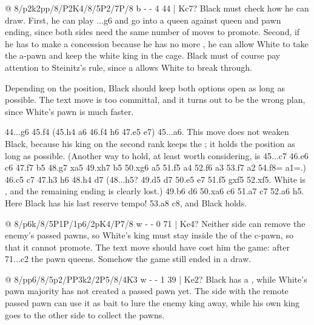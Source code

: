 @ 8/p2k2pp/8/P2K4/8/5P2/7P/8 b - - 4 44 | Kc7?
Black must check how he can draw. First, he can play ...g6 and go into a queen against queen and pawn
ending, since both sides need the same number of moves to promote. Second, if he has to make a
concession because he has no more ,
he can allow White to take the a-pawn and keep the white king in the cage. Black must of course pay
attention to Steinitz's rule, since a
 allows White to break through.

Depending on the position, Black should keep both options open as long as possible. The text move is
too committal, and it turns out to be the wrong plan, since White's pawn is much faster.

44...g6 45.f4 (45.h4 a6 46.f4 h6 47.\K e5 \K e7) 45...a6. This move does not weaken Black, because
his king on the second rank keeps the ; it
holds the position as long as possible. (Another way to hold, at least worth considering, is 45...\K c7
46.\K e6 \K c6 47.\K f7 \K b5 48.\K g7 \K xa5 49.\K xh7 \K b5 50.\K xg6 a5 51.f5 a4 52.f6 a3 53.f7
a2 54.f8=\Q{} a1=\Q{}.) 46.\K c5 \K c7 47.h3 h6 48.h4 \K d7 (48...h5? 49.\K d5 \K d7 50.\K e5 \K e7
51.f5 gxf5 52.\K xf5. White is ,
and the remaining ending is clearly lost.) 49.\K b6 \K d6 50.\K xa6 \K c6 51.\K a7 \K c7 52.a6 h5.
Here Black has his last reserve tempo! 53.\K a8 \K c8, and Black holds.

@ 8/p6k/8/5P1P/1p6/2pK4/P7/8 w - - 0 71 | Ke4?
Neither side can remove the enemy's passed pawns, so White's king must stay inside the
 of the c-pawn, so
that it cannot promote. The text move should have cost him the game: after 71...c2 the pawn queens.
Somehow the game still ended in a draw.

@ 8/pp6/8/5p2/PP3k2/2P5/8/4K3 w - - 1 39 | Ke2?
Black has a , while White's
pawn majority has not created a passed pawn yet. The side with the remote passed pawn can use it as
bait to lure the enemy king away, while his own king goes to the other side to collect the pawns.

